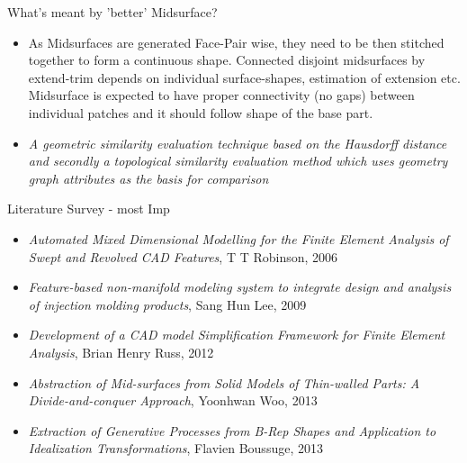 \begin{frame}[<+-| alert@+>]{What's meant by 'better' Midsurface?}
\begin{itemize}[noitemsep,label=\textbullet,topsep=2pt,parsep=2pt,partopsep=2pt]
\item As Midsurfaces are generated Face-Pair wise, they need to be then stitched together to form a continuous shape. Connected  disjoint midsurfaces by extend-trim depends on individual surface-shapes, estimation of extension etc. Midsurface is expected to have proper connectivity  (no gaps) between individual patches and it should follow shape of the base part.
\item {\it A geometric similarity evaluation technique based on the Hausdorff distance and secondly a topological similarity evaluation method which uses geometry graph attributes as the basis for comparison} \cite{Lockett2008}
\end{itemize}
\end{frame}

\begin{frame}[<+-| alert@+>]{Literature Survey - most Imp}
\begin{itemize}[noitemsep,label=\textbullet,topsep=2pt,parsep=2pt,partopsep=2pt]
\item {\it Automated Mixed Dimensional Modelling for the Finite Element Analysis of Swept and Revolved CAD Features}, T T Robinson, 2006
\item {\it Feature-based non-manifold modeling system to integrate design and analysis of injection molding products}, Sang Hun Lee, 2009
\item {\it Development of a CAD model Simplification Framework for Finite Element Analysis}, Brian Henry Russ, 2012
\item {\it Abstraction of Mid-surfaces from Solid Models of Thin-walled Parts: A Divide-and-conquer Approach}, Yoonhwan Woo, 2013
\item {\it Extraction of Generative Processes from B-Rep Shapes and Application to Idealization Transformations}, Flavien Boussuge, 2013

\end{itemize}


\end{frame}


